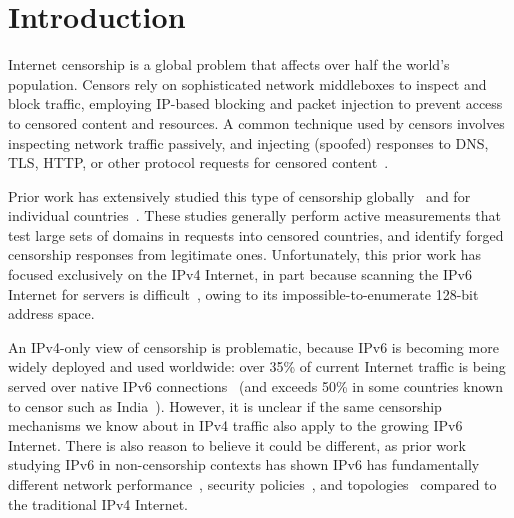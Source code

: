 \section{Introduction}\label{sec:intro}


Internet censorship is a global problem that affects over half the world's
population. Censors rely on sophisticated network middleboxes to inspect and
block traffic, employing IP-based blocking and packet injection to prevent
access to censored content and resources. A common technique used by censors involves
inspecting network traffic
passively, and injecting (spoofed) responses to DNS, TLS, HTTP, or other protocol
requests for censored
content~\cite{lowe2007great,hoang2021great,vandersloot2018quack,xu2011internet,aryan2013internet,chai2019importance,elmenhorst2021web}.


Prior work has extensively studied this type of censorship
globally~\cite{niaki2020iclab,sundara2020censored,filasto2012ooni,razaghpanah2016exploring,kuhrer2015going,dagon2008corrupted,pearce2017global,scott2016satellite}
%
and for individual
countries~\cite{Anonymous2020:TripletCensors,USESEC21:GFWatch,aryan2013internet,ramesh2020decentralized,yadav2018light,gebhart2017internet,nabi2013anatomy}.
%
These studies generally perform active measurements that test large
sets of domains in requests into censored countries, and identify forged
censorship responses from legitimate ones.
%
Unfortunately, this prior work has focused exclusively on the IPv4 Internet, in
part because scanning the IPv6 Internet for servers is
difficult~\cite{murdock2017target}, owing to its impossible-to-enumerate 128-bit
address space.
%

An IPv4-only view of censorship is problematic, because
IPv6 is becoming more widely deployed and used worldwide: over 35\% of current Internet
traffic is being served over native IPv6 connections~\cite{Google-IPv6} (and exceeds
50\% in some countries known to censor such as India~\cite{akamai-ipv6}).
However, it
is unclear if the same censorship mechanisms we know about in IPv4 traffic
also apply to the growing IPv6 Internet.
There is also reason to believe it could be
different, as prior work studying IPv6 in non-censorship contexts has shown IPv6 has
fundamentally different network performance~\cite{Dhamdhere-IMC2012}, security
policies~\cite{Czyz-NDSS2016}, and topologies~\cite{Czyz-SIGCOMM2014}
compared to the traditional IPv4 Internet.
%

